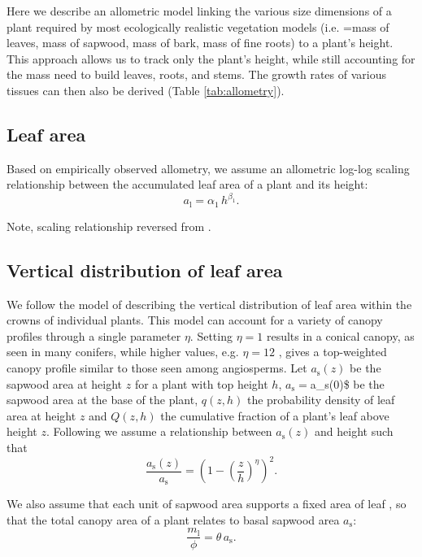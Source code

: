 \documentclass[10pt,twoside]{article}
\begin{document}
Here we describe an allometric model linking the various size dimensions
of a plant required by most ecologically realistic vegetation models
(i.e. =mass of leaves, mass of sapwood, mass of bark, mass of fine
roots) to a plant's height. This approach allows us to track only the
plant's height, while still accounting for the mass need to build
leaves, roots, and stems. The growth rates of various tissues can then
also be derived (Table \ref{tab:allometry}).

\subsection{Leaf area}\label{leaf-area}

Based on empirically observed allometry, we assume an allometric log-log
scaling relationship between the accumulated leaf area of a plant and
its height:
\begin{equation}\label{eq:ha}
a_\textrm{l}=\alpha_1 \, h^{\beta_1}.
\end{equation}

Note, scaling relationship reversed from \citep{Falster-2011}.

\subsection{Vertical distribution of leaf
area}\label{vertical-distribution-of-leaf-area}

We follow the model of \citet{Yokozawa-1995} describing the vertical
distribution of leaf area within the crowns of individual plants. This
model can account for a variety of canopy profiles through a single
parameter \(\eta\). Setting \(\eta=1\) results in a conical canopy, as
seen in many conifers, while higher values, e.g. \(\eta=12\) , gives a
top-weighted canopy profile similar to those seen among angiosperms. Let
\(a_\textrm{s}(z)\) be the sapwood area at height \(z\) for a plant with
top height \(h\), \(a_\textrm{s} =\)a\_\textrm{s}(0)\$ be the sapwood
area at the base of the plant, \(q(z,h)\) the probability density of
leaf area at height \(z\) and \(Q(z,h)\) the cumulative fraction of a
plant's leaf above height \(z\). Following \citet{Yokozawa-1995} we
assume a relationship between \(a_\textrm{s}(z)\) and height such that
\begin{equation}\label{eq:crown1}
\frac{a_\textrm{s}(z)}{a_\textrm{s}}= \left(1-\left(\frac{z}{h}\right)^\eta\right)^2.
\end{equation}

We also assume that each unit of sapwood area supports a fixed area of
leaf \citep[the pipe model][]{Shinozaki-1964}, so that the total canopy
area of a plant relates to basal sapwood area \(a_\textrm{s}\):
\begin{equation}\label{eq:crown2}
\frac{m_\textrm{l}}{\phi}= \theta \, a_\textrm{s}.
\end{equation}
\end{document}
